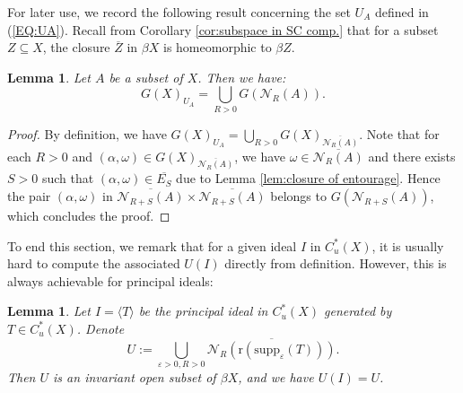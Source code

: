 \documentclass[12pt, a4paper]{amsart}
\numberwithin{equation}{section}
\newtheorem{lem}[thm]{Lemma}
\theoremstyle{definition}
\theoremstyle{remark}
\newtheorem{rem}[thm]{Remark}
\def\Nd{\mathcal{N}}
\def\supp{\mathrm{supp}}
\def\r{\mathrm{r}}
\begin{document}
For later use, we record the following result concerning the set $U_A$ defined in (\ref{EQ:UA}). Recall from Corollary \ref{cor:subspace in SC comp.} that for a subset $Z \subseteq X$, the closure $\overline{Z}$ in $\beta X$ is homeomorphic to $\beta Z$. 

\begin{lem}\label{lem:dec for groupoids UA}
Let $A$ be a subset of $X$. Then we have:
\[
G(X)_{U_A} = \bigcup_{R>0} G(\Nd_R(A)).
\]
\end{lem}

\begin{proof}
By definition, we have $G(X)_{U_A} = \bigcup_{R>0} G(X)_{\overline{\Nd_R(A)}}$. Note that for each $R>0$ and $(\alpha, \omega) \in G(X)_{\overline{\Nd_R(A)}}$, we have $\omega \in \overline{\Nd_R(A)}$ and there exists $S>0$ such that $(\alpha, \omega) \in \overline{E_S}$ due to Lemma \ref{lem:closure of entourage}. Hence the pair $(\alpha, \omega)$ in $\overline{\Nd_{R+S}(A)} \times \overline{\Nd_{R+S}(A)}$ belongs to $G(\Nd_{R+S}(A))$, which concludes the proof.
\end{proof}




To end this section, we remark that for a given ideal $I$ in $C^*_u(X)$, it is usually hard to compute the associated $U(I)$ directly from definition. However, this is always achievable for principal ideals:

\begin{lem}\label{lem: U(I) for principal ideals}
Let $I=\langle T \rangle$ be the principal ideal in $C^*_u(X)$ generated by $T \in C^*_u(X)$. Denote
\[
U:= \bigcup_{\varepsilon >0, R>0} \overline{\Nd_R(\r(\supp_\varepsilon(T)))}.
\]
Then $U$ is an invariant open subset of $\beta X$, and we have $U(I)=U$.
\end{lem}
\end{document}
